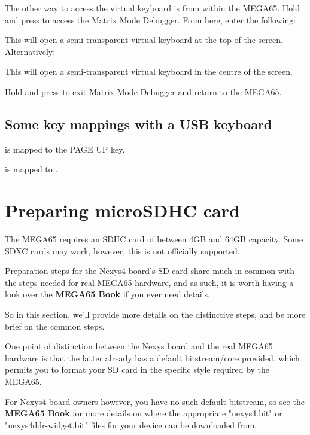 The other way to access the virtual keyboard is from within the MEGA65. Hold \megasymbolkey and press  to access the Matrix Mode Debugger. From here, enter the following:


This will open a semi-transparent virtual keyboard at the top of the screen. Alternatively:


This will open a semi-transparent virtual keyboard in the centre of the screen.

Hold \megasymbolkey and press  to exit Matrix Mode Debugger and return to the MEGA65.

\subsection{Some key mappings with a USB keyboard}

 is mapped to the PAGE UP key.

 is mapped to .

\newpage

\section{Preparing microSDHC card}

The MEGA65 requires an SDHC card of between 4GB and 64GB capacity.  Some SDXC cards may work, however, this is not officially supported.

Preparation steps for the Nexys4 board's SD card share much in common with the
steps needed for real MEGA65 hardware, and as such, it is worth having a look
over
\ifdefined\printmanual
the {\bf MEGA65 Book}
\else
{}
\fi
if you ever need details.

So in this section, we'll provide more details on the distinctive steps, and be more brief on the common steps.

One point of distinction between the Nexys board and the real MEGA65 hardware is that the latter already has a default bitstream/core provided, which permits you to format your SD card in the specific style required by the MEGA65.

For Nexys4 board owners however, you have no such default bitstream, so
see
\ifdefined\printmanual
the {\bf MEGA65 Book}
\else
{}
\fi
for more details on where the appropriate "nexys4.bit" or "nexys4ddr-widget.bit" files for your device can be downloaded from.

